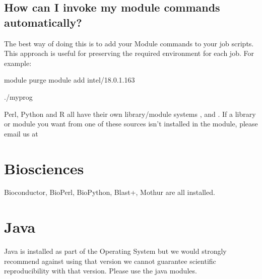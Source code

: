 \documentclass[letterpaper,10pt,english]{sphinxmanual}
\begin{document}
\subsection{How can I invoke my module commands automatically?}
\label{\detokenize{software/environment_modules:how-can-i-invoke-my-module-commands-automatically}}
The best way of doing this is to add your Module commands to your job scripts. This approach is useful for preserving the required environment for each job. For example:

\begin{sphinxVerbatim}[commandchars=\\\{\}]


module purge
module add intel/18.0.1.163

 

./myprog
\end{sphinxVerbatim}

Perl, Python and R all have their own library/module systems \sphinxhyphen{} ,  and . If a library or module you want from one of these sources isn’t installed in the module, please email us at 


\section{Biosciences}
\label{\detokenize{software/biosciences:biosciences}}\label{\detokenize{software/biosciences::doc}}
Bioconductor, BioPerl, BioPython, Blast+, Mothur are all installed.


\section{Java}
\label{\detokenize{software/java:java}}\label{\detokenize{software/java::doc}}
Java is installed as part of the Operating System but we would strongly recommend against using that version \sphinxhyphen{} we cannot guarantee scientific reproducibility with that version. Please use the java modules.
\end{document}
